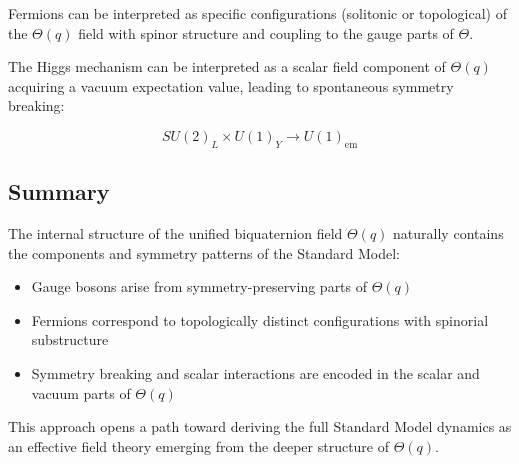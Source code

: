 Fermions can be interpreted as specific configurations (solitonic or topological) of the \(\Theta(q)\) field
with spinor structure and coupling to the gauge parts of \(\Theta\).

The Higgs mechanism can be interpreted as a scalar field component of \(\Theta(q)\) acquiring a vacuum expectation value,
leading to spontaneous symmetry breaking:

\[
SU(2)_L \times U(1)_Y \rightarrow U(1)_{\text{em}}
\]

\subsection*{Summary}

The internal structure of the unified biquaternion field \(\Theta(q)\) naturally contains the components and
symmetry patterns of the Standard Model:

\begin{itemize}
  \item Gauge bosons arise from symmetry-preserving parts of \(\Theta(q)\)
  \item Fermions correspond to topologically distinct configurations with spinorial substructure
  \item Symmetry breaking and scalar interactions are encoded in the scalar and vacuum parts of \(\Theta(q)\)
\end{itemize}

This approach opens a path toward deriving the full Standard Model dynamics as an effective field theory
emerging from the deeper structure of \(\Theta(q)\).
